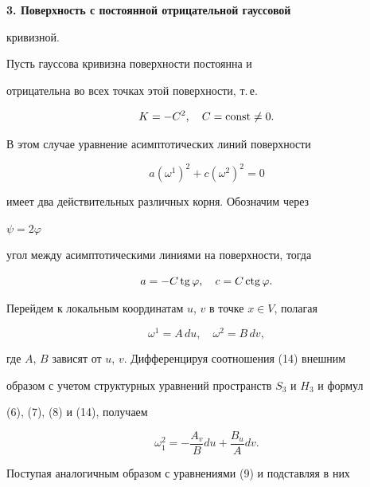 {\bf 3. Поверхность с постоянной отрицательной гауссовой 


кривизной.} Пусть гауссова кривизна поверхности постоянна и 


отрицательна во всех точках этой поверхности, т.\,е. 


\begin{equation} 


K=-C^2,\quad C=\const\ne0. 


\end{equation} 


В этом случае уравнение асимптотических линий поверхности 


\begin{equation} 


a(\omega^1)^2+c(\omega^2)^2=0 


\end{equation} 


имеет два действительных различных корня. Обозначим через 


$\psi=2\varphi$


угол между асимптотическими линиями на поверхности, тогда 


\begin{equation} 


a=-C\tg\varphi,\quad c=C\ctg\varphi. 


\end{equation} 


 


Перейдем к локальным координатам $u$, $v$ в точке $x\in V$, полагая 


\begin{equation} 


\omega^1=A\,du,\quad \omega^2=B\,d v, 


\end{equation} 


где $A$, $B$ зависят от $u$, $v$. Дифференцируя соотношения (14) внешним 


образом с учетом структурных уравнений пространств $S_3$ и $H_3$ и формул 


(6), (7), (8) и (14), получаем 


\begin{equation} 


\omega^2_1=-\frac{A_v}{B}d u+\frac{B_u}{A}d v. 


\end{equation} 


Поступая аналогичным образом с уравнениями (9) и подставляя в них 


